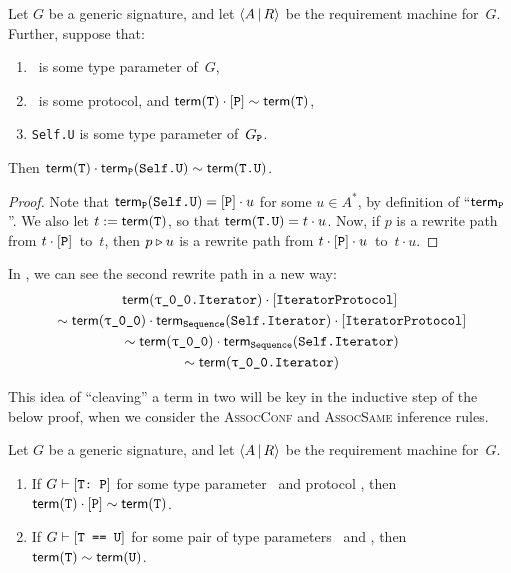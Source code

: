 \documentclass[../generics]{subfiles}
\begin{document}
\begin{lemma}\label{type param composition lemma}
Let $G$ be a generic signature, and let $\langle A\,|\,R\rangle$ be the requirement machine for~$G$. Further, suppose that:
\begin{enumerate}
\item \tT\ is some type parameter of~$G$,
\item \tP\ is some protocol, and $\mathsf{term}(\texttt{T})\cdot[\texttt{P}]\sim\mathsf{term}(\texttt{T})$,
\item \texttt{Self.U} is some type parameter of~$G_{\texttt{P}}$. 
\end{enumerate}
Then $\mathsf{term}(\texttt{T})\cdot\mathsf{term}_{\texttt{P}}(\texttt{Self.U}) \sim \mathsf{term}(\texttt{T.U})$.
\end{lemma}
\begin{proof}
Note that $\mathsf{term}_{\texttt{P}}(\texttt{Self.U})=[\texttt{P}]\cdot u$ for some $u\in A^*$, by definition of ``$\mathsf{term}_{\texttt{P}}$''. We also let $t := \mathsf{term}(\texttt{T})$, so that $\mathsf{term}(\texttt{T.U})=t\cdot u$. Now, if $p$ is a rewrite path from $t\cdot[\texttt{P}]$~to~$t$, then $p\triangleright u$ is a rewrite path from $t\cdot[\texttt{P}]\cdot u$~to~$t\cdot u$.
\end{proof}

\begin{example}
In , we can see the second rewrite path in a new way:
\begin{gather*}
\Term(\texttt{\rT.Iterator})\cdot\pIterator\\
{} \sim \Term(\rT) \cdot \TermP{Sequence}(\texttt{Self.Iterator}) \cdot \pIterator\\
{} \sim \Term(\rT) \cdot \TermP{Sequence}(\texttt{Self.Iterator})\\
{} \sim \Term(\texttt{\rT.Iterator})
\end{gather*}
\end{example}

This idea of ``cleaving'' a term in two will be key in the inductive step of the below proof, when we consider the \textsc{AssocConf} and \textsc{AssocSame} inference rules.

\newcommand{\Path}{\mathsf{path}\,}

\begin{theorem}\label{derivation to path swift}
Let $G$ be a generic signature, and let $\langle A\,|\,R\rangle$ be the requirement machine for~$G$.
\begin{enumerate}
\item If $G\vdash[\texttt{T:~P}]$ for some type parameter \tT\ and protocol \tP, then $\mathsf{term}(\texttt{T})\cdot[\texttt{P}] \sim \mathsf{term}(\texttt{T})$.
\item If $G\vdash[\texttt{T == U}]$ for some pair of type parameters \tT\ and \tU, then $\mathsf{term}(\texttt{T}) \sim \mathsf{term}(\texttt{U})$.
\end{enumerate}
\end{theorem}
\end{document}
